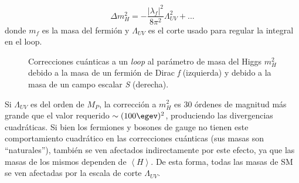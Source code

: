 \begin{equation}
\Delta m_{H}^{2}=-\frac{|\lambda_{f}|^{2}}{8\pi^{2}}\Lambda_{UV}^{2}+...
\label{fermion_corr}
\end{equation}
donde $m_{f}$ es la masa del fermión y $\Lambda_{UV}$ es el corte usado para regular la integral en el loop. 

\begin{figure}
\centering

	\begin{subfigure}{0.45\textwidth}
	\end{subfigure}
	\hfill
	\begin{subfigure}{0.45\textwidth}
	\end{subfigure}

\caption{Correcciones cuánticas a un \textit{loop} al parámetro de masa del Higgs $m_{H}^{2}$ debido a la masa de un fermión de Dirac \textit{f} (izquierda) y debido a la masa de un campo escalar \textit{S} (derecha).}
\label{loops}
\end{figure}

Si $\Lambda_{UV}$ es del orden de $M_{P}$, la corrección a $m_{H}^{2}$ es 30 órdenes de magnitud más grande que el valor requerido $\sim (100 \egev)^{2}$, produciendo las divergencias cuadráticas. Si bien los fermiones y bosones de gauge no tienen este comportamiento cuadrático en las correcciones cuánticas (sus masas son “naturales”), también se ven afectados indirectamente por este efecto, ya que las masas de los mismos dependen de $\left\langle H \right\rangle$. De esta forma, todas las masas de SM se ven afectadas por la escala de corte $\Lambda_{UV}$.

